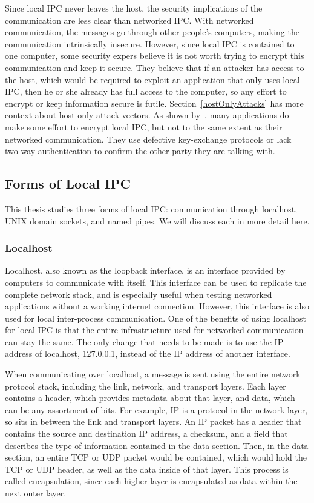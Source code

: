 Since local IPC never leaves the host, the security implications of the communication are less clear than networked IPC.  With networked communication, the messages go through other people's computers, making the communication intrinsically insecure.  However, since local IPC is contained to one computer, some security expers believe it is not worth trying to encrypt this communication and keep it secure.  They believe that if an attacker has access to the host, which would be required to exploit an application that only uses local IPC, then he or she already has full access to the computer, so any effort to encrypt or keep information secure is futile.  Section~\ref{hostOnlyAttacks} has more context about host-only attack vectors.  As shown by~\cite{MitMa}, many applications do make some effort to encrypt local IPC, but not to the same extent as their networked communication.  They use defective key-exchange protocols or lack two-way authentication to confirm the other party they are talking with.

\subsection{Forms of Local IPC}
This thesis studies three forms of local IPC: communication through localhost, UNIX domain sockets, and named pipes.  We will discuss each in more detail here.

\subsubsection{Localhost}
Localhost, also known as the loopback interface, is an interface provided by computers to communicate with itself.  This interface can be used to replicate the complete network stack, and is especially useful when testing networked applications without a working internet connection.  However, this interface is also used for local inter-process communication.  One of the benefits of using localhost for local IPC is that the entire infrastructure used for networked communication can stay the same.  The only change that needs to be made is to use the IP address of localhost, 127.0.0.1, instead of the IP address of another interface.

When communicating over localhost, a message is sent using the entire network protocol stack, including the link, network, and transport layers.  Each layer contains a header, which provides metadata about that layer, and data, which can be any assortment of bits.  For example, IP is a protocol in the network layer, so sits in between the link and transport layers.  An IP packet has a header that contains the source and destination IP address, a checksum, and a field that describes the type of information contained in the data section.  Then, in the data section, an entire TCP or UDP packet would be contained, which would hold the TCP or UDP header, as well as the data inside of that layer.  This process is called encapsulation, since each higher layer is encapsulated as data within the next outer layer.

